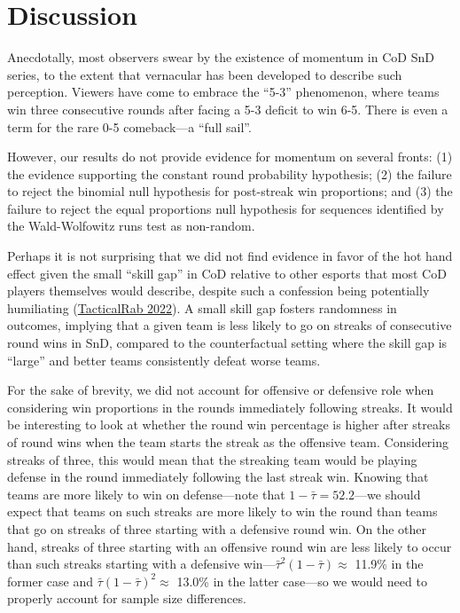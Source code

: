 \documentclass{article}
\begin{document}
\hypertarget{discussion}{%
\section{Discussion}\label{discussion}}

Anecdotally, most observers swear by the existence of momentum in CoD
SnD series, to the extent that vernacular has been developed to describe
such perception. Viewers have come to embrace the ``5-3'' phenomenon,
where teams win three consecutive rounds after facing a 5-3 deficit to
win 6-5. There is even a term for the rare 0-5 comeback---a ``full
sail''.

However, our results do not provide evidence for momentum on several
fronts: (1) the evidence supporting the constant round probability
hypothesis; (2) the failure to reject the binomial null hypothesis for
post-streak win proportions; and (3) the failure to reject the equal
proportions null hypothesis for sequences identified by the
Wald-Wolfowitz runs test as non-random.

Perhaps it is not surprising that we did not find evidence in favor of
the hot hand effect given the small ``skill gap'' in CoD relative to
other esports that most CoD players themselves would describe, despite
such a confession being potentially humiliating
(\protect\hyperlink{ref-tacticalrab2022}{TacticalRab 2022}). A small
skill gap fosters randomness in outcomes, implying that a given team is
less likely to go on streaks of consecutive round wins in SnD, compared
to the counterfactual setting where the skill gap is ``large'' and
better teams consistently defeat worse teams.

For the sake of brevity, we did not account for offensive or defensive
role when considering win proportions in the rounds immediately
following streaks. It would be interesting to look at whether the round
win percentage is higher after streaks of round wins when the team
starts the streak as the offensive team. Considering streaks of three,
this would mean that the streaking team would be playing defense in the
round immediately following the last streak win. Knowing that teams are
more likely to win on defense---note that \(1 - \bar{\tau} = 52.2%
\)---we should expect that teams on such streaks are more likely to win
the round than teams that go on streaks of three starting with a
defensive round win. On the other hand, streaks of three starting with
an offensive round win are less likely to occur than such streaks
starting with a defensive
win---\(\bar{\tau}^2 (1 - \bar{\tau}) \approx\) 11.9\% in the former
case and \(\bar{\tau} (1 - \bar{\tau})^2 \approx\) 13.0\% in the latter
case---so we would need to properly account for sample size differences.
\end{document}
